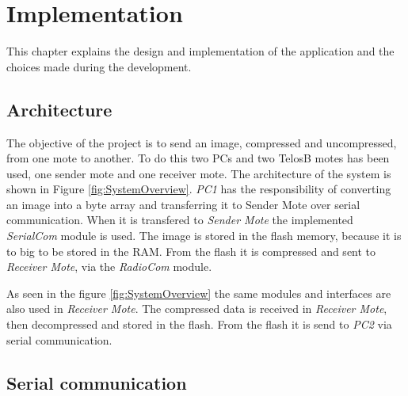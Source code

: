 \chapter{Implementation}
\label{chp:impl}

This chapter explains the design and implementation of the application and the choices made during the development.

\section{Architecture}
The objective of the project is to send an image, compressed and uncompressed, from one mote to another. To do this two PCs and two TelosB motes has been used, one sender mote and one receiver mote. The architecture of the system is shown in Figure \ref{fig:SystemOverview}. \emph{PC1} has the responsibility of converting an image into a byte array and transferring it to Sender Mote over serial communication. When it is transfered to \emph{Sender Mote} the implemented \emph{SerialCom} module is used. The image is stored in the flash memory, because it is to big to be stored in the RAM. From the flash it is compressed and sent to \emph{Receiver Mote}, via the \emph{RadioCom} module.


As seen in the figure \ref{fig:SystemOverview} the same modules and interfaces are also used in \emph{Receiver Mote}. The compressed data is received in \emph{Receiver Mote}, then decompressed and stored in the flash. From the flash it is send to \emph{PC2} via serial communication. 


\section{Serial communication}

